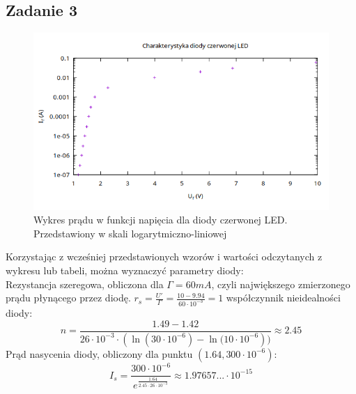 \documentclass{article}
\begin{document}
\subsection{Zadanie 3}
\centering
\begin{figure}[h]
  \includegraphics[scale=0.5]{./img/Z3_U.png}
  \caption{Wykres prądu w funkcji napięcia dla diody czerwonej LED. Przedstawiony w skali logarytmiczno-liniowej}
\end{figure}
Korzystając z wcześniej przedstawionych wzorów i wartości odczytanych z wykresu lub tabeli, można wyznaczyć parametry diody: \\
Rezystancja szeregowa, obliczona dla $\Gamma=60mA$, czyli największego zmierzonego prądu płynącego przez diodę.  $r_s=\frac{U'}{\Gamma} = \frac{10-9.94}{60 \cdot 10^{-3}}=1$
współczynnik nieidealności diody: \[n = \frac{1.49-1.42}
{26 \cdot 10^{-3} \cdot (\ln{(30 \cdot 10^{-6})}-\ln{(10 \cdot 10^{-6}}))} \approx 2.45\]
Prąd nasycenia diody, obliczony dla punktu $(1.64,300\cdot10^{-6})$: \[I_s=\frac{300 \cdot 10^{-6}}{e^{\frac{1.64}{2.45 \cdot 26 \cdot 10^{-3}}}} \approx 1.97657... \cdot 10^{-15}\]
\break
\raggedright
\end{document}

